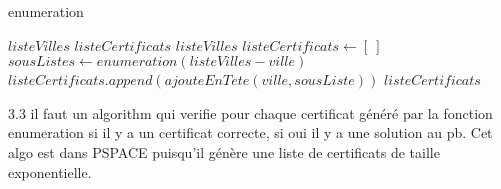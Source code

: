 \documentclass[a4paper,10pt]{article}
\begin{document}
\begin{algorithm}
\caption{enumeration}
\begin{algorithmic}
\REQUIRE $listeVilles$
\ENSURE $listeCertificats$
  \RETURN $listeVilles$
\ENDIF
\STATE $listeCertificats \leftarrow [~]$
  \STATE $sousListes \leftarrow enumeration(listeVilles - ville)$
    \STATE $listeCertificats.append(ajouteEnTete(ville,sousListe)) $
  \ENDFOR
\ENDFOR
\RETURN $listeCertificats$
\end{algorithmic}
\end{algorithm}

3.3 il faut un algorithm qui verifie pour chaque certificat généré par la fonction enumeration si il y a un
certificat correcte, si oui il y a une solution au pb. Cet algo est dans PSPACE puisqu'il génère une liste de certificats de taille exponentielle.
\end{document}
